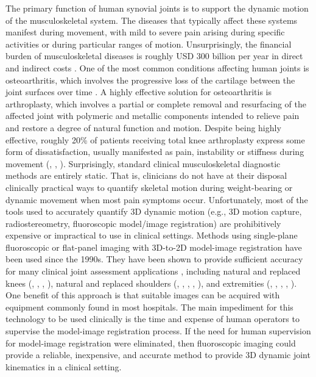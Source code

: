 The primary function of human synovial joints is to support the dynamic motion of the musculoskeletal system. The diseases that typically affect these systems manifest during movement, with mild to severe pain arising during specific activities or during particular ranges of motion. Unsurprisingly, the financial burden of musculoskeletal diseases is roughly USD 300 billion per year in direct and indirect costs \cite{BMUSBurdenMusculoskeletal}. One of the most common conditions affecting human joints is osteoarthritis, which involves the progressive loss of the cartilage between the joint surfaces over time \cite{sharmaOsteoarthritisCompanionRheumatology2007}. A highly effective solution for osteoarthritis is arthroplasty, which involves a partial or complete removal and resurfacing of the affected joint with polymeric and metallic components intended to relieve pain and restore a degree of natural function and motion. Despite being highly effective, roughly 20\% of patients receiving total knee arthroplasty express some form of dissatisfaction, usually manifested as pain, instability or stiffness during movement (\cite{bakerRolePainFunction2007}, \cite{scottPredictingDissatisfactionFollowing2010}, \cite{bournePatientSatisfactionTotal2010}). Surprisingly, standard clinical musculoskeletal diagnostic methods are entirely static. That is, clinicians do not have at their disposal clinically practical ways to quantify skeletal motion during weight-bearing or dynamic movement when most pain symptoms occur. Unfortunately, most of the tools used to accurately quantify 3D dynamic motion (e.g., 3D motion capture, radiostereometry, fluoroscopic model/image registration) are prohibitively expensive or impractical to use in clinical settings. Methods using single-plane fluoroscopic or flat-panel imaging with 3D-to-2D model-image registration have been used since the 1990s. They have been shown to provide sufficient accuracy for many clinical  joint assessment applications , including natural and replaced knees (\cite{banksAccurateMeasurementThreedimensional1996}, \cite{banksVivoKinematicsCruciateretaining1997}, \cite{mahfouzRobustMethodRegistration2003}, \cite{zuffiModelbasedMethodReconstruction1999}), natural and replaced shoulders (\cite{matsukiVivo3DAnalysis2014}, \cite{matsukiDynamicVivoGlenohumeral2012}, \cite{zhuAccuracyRepeatabilityAutomatic2012}, \cite{matsukiVivo3dimensionalAnalysis2011}, \cite{kijimaVivo3dimensionalAnalysis2015}), and extremities (\cite{yamaguchiAnkleSubtalarKinematics2009}, \cite{listThreeDimensionalKinematicsUnconstrained2012}, \cite{cenniKinematicsThreeComponents2012}, \cite{cenniFunctionalPerformanceTotal2013}, \cite{tersi3DElbowKinematics2009}). One benefit of this approach is that suitable images can be acquired with equipment commonly found in most hospitals. The main impediment for this technology to be used clinically is the time and expense of human operators to supervise the model-image registration process. If the need for human supervision for model-image registration were eliminated, then fluoroscopic imaging could provide a reliable, inexpensive, and accurate method to provide 3D dynamic joint kinematics in a clinical setting.
